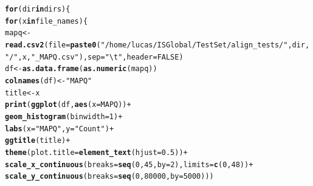 \documentclass[12pt, a4paper]{article}\usepackage[]{graphicx}\usepackage[]{color}
\makeatletter
\newcommand{\hlnum}[1]{\textcolor[rgb]{0.686,0.059,0.569}{#1}}%
\newcommand{\hlstr}[1]{\textcolor[rgb]{0.192,0.494,0.8}{#1}}%
\newcommand{\hlopt}[1]{\textcolor[rgb]{0,0,0}{#1}}%
\newcommand{\hlstd}[1]{\textcolor[rgb]{0.345,0.345,0.345}{#1}}%
\newcommand{\hlkwa}[1]{\textcolor[rgb]{0.161,0.373,0.58}{\textbf{#1}}}%
\newcommand{\hlkwb}[1]{\textcolor[rgb]{0.69,0.353,0.396}{#1}}%
\newcommand{\hlkwc}[1]{\textcolor[rgb]{0.333,0.667,0.333}{#1}}%
\newcommand{\hlkwd}[1]{\textcolor[rgb]{0.737,0.353,0.396}{\textbf{#1}}}%
\newenvironment{kframe}{%
 \def\at@end@of@kframe{}%
 \ifinner\ifhmode%
  \def\at@end@of@kframe{\end{minipage}}%
  \begin{minipage}{\columnwidth}%
 \fi\fi%
 \def\FrameCommand##1{\hskip\@totalleftmargin \hskip-\fboxsep
 \colorbox{shadecolor}{##1}\hskip-\fboxsep
     \hskip-\linewidth \hskip-\@totalleftmargin \hskip\columnwidth}%
 \MakeFramed {\advance\hsize-\width
   \@totalleftmargin\z@ \linewidth\hsize
   \@setminipage}}%
 {\par\unskip\endMakeFramed%
 \at@end@of@kframe}
\newenvironment{knitrout}{}{} %
\makeatother
\begin{document}
\begin{knitrout}
\color{fgcolor}\begin{kframe}
\begin{alltt}
\hlkwa{for} \hlstd{(dir} \hlkwa{in} \hlstd{dirs)\{}
  \hlkwa{for} \hlstd{(x} \hlkwa{in} \hlstd{file_names)\{}
    \hlstd{mapq} \hlkwb{<-} \hlkwd{read.csv2}\hlstd{(}\hlkwc{file} \hlstd{=} \hlkwd{paste0}\hlstd{(}\hlstr{"/home/lucas/ISGlobal/TestSet/align_tests/"}\hlstd{,dir,}\hlstr{"/"}\hlstd{,x,}\hlstr{"_MAPQ.csv"}\hlstd{),} \hlkwc{sep} \hlstd{=} \hlstr{"\textbackslash{}t"}\hlstd{,} \hlkwc{header} \hlstd{=} \hlnum{FALSE}\hlstd{)}
    \hlstd{df} \hlkwb{<-} \hlkwd{as.data.frame}\hlstd{(}\hlkwd{as.numeric}\hlstd{(mapq))}
    \hlkwd{colnames}\hlstd{(df)} \hlkwb{<-} \hlstr{"MAPQ"}
    \hlstd{title} \hlkwb{<-} \hlstd{x}
    \hlkwd{print}\hlstd{(}\hlkwd{ggplot}\hlstd{(df,} \hlkwd{aes}\hlstd{(}\hlkwc{x} \hlstd{= MAPQ))} \hlopt{+}
        \hlkwd{geom_histogram}\hlstd{(}\hlkwc{binwidth} \hlstd{=} \hlnum{1}\hlstd{)} \hlopt{+}
        \hlkwd{labs}\hlstd{(}\hlkwc{x} \hlstd{=} \hlstr{"MAPQ"}\hlstd{,} \hlkwc{y} \hlstd{=} \hlstr{"Count"}\hlstd{)} \hlopt{+}
        \hlkwd{ggtitle}\hlstd{(title)} \hlopt{+}
        \hlkwd{theme}\hlstd{(}\hlkwc{plot.title} \hlstd{=} \hlkwd{element_text}\hlstd{(}\hlkwc{hjust} \hlstd{=} \hlnum{0.5}\hlstd{))} \hlopt{+}
        \hlkwd{scale_x_continuous}\hlstd{(}\hlkwc{breaks} \hlstd{=} \hlkwd{seq}\hlstd{(}\hlnum{0}\hlstd{,} \hlnum{45}\hlstd{,} \hlkwc{by} \hlstd{=} \hlnum{2}\hlstd{),} \hlkwc{limits} \hlstd{=} \hlkwd{c}\hlstd{(}\hlnum{0}\hlstd{,}\hlnum{48}\hlstd{))} \hlopt{+}
        \hlkwd{scale_y_continuous}\hlstd{(}\hlkwc{breaks} \hlstd{=} \hlkwd{seq}\hlstd{(}\hlnum{0}\hlstd{,}\hlnum{80000}\hlstd{,} \hlkwc{by} \hlstd{=} \hlnum{5000}\hlstd{)))}


\end{alltt}
\end{kframe}
\end{knitrout}
\end{document}
